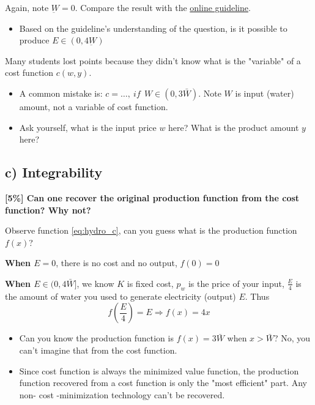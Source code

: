 \documentclass{article}
\begin{document}
\begin{mdframed}[backgroundcolor=blue!20,linecolor=white]
Again, note $\underbar{W} = 0$. Compare the result with the \href{https://www.uio.no/studier/emner/sv/oekonomi/ECON4220/previous-exams/econ32_4220_2019h_sensorveiledning.pdf}{online guideline}. 

\begin{itemize}
\item Based on the guideline's understanding of the question, is it possible to produce $E \in (0, 4\underbar{W})$
\end{itemize}
\end{mdframed}

\begin{mdframed}[backgroundcolor=yellow!20,linecolor=white]
Many students lost points because they didn't know what is the "variable" of a cost function $c(w,y)$.

\begin{itemize}
\item A common mistake is: $c = \dots , \ if \ \ W \in (0,3\bar{W})$. Note $W$ is input (water) amount, not a variable of cost function.
\item Ask yourself, what is the input price $w$ here? What is the product amount $y$ here?

\end{itemize}


\end{mdframed}


\subsection{c) Integrability}
\textbf{ [5\%] Can one recover the original production function from the
cost function? Why not?}

\begin{mdframed}[backgroundcolor=blue!20,linecolor=white]
Observe function \ref{eq:hydro_c}, can you guess what is the production function $f(x)$?

\textbf{When $E=0$}, there is no cost and no output, $f(0) = 0$

\textbf{When $E \in (0,4\bar{W}]$}, we know $K$ is fixed cost, $p_w$ is the price of your input,  $\frac{E}{4}$ is the
amount of water you used to generate electricity (output) $E$. Thus $$f(\frac{E}{4}) = E \Rightarrow f(x) = 4x$$

\begin{itemize}
\item Can you know the production function is $f(x) = 3\bar{W}$ when $x > \bar{W}$? No, you can't imagine that from the cost function.
\item Since cost function is always the minimized value function, the production function recovered from a cost function is only the "most efficient" part. Any non- cost -minimization technology can't be recovered. 
\end{itemize}
\end{mdframed}
\end{document}
